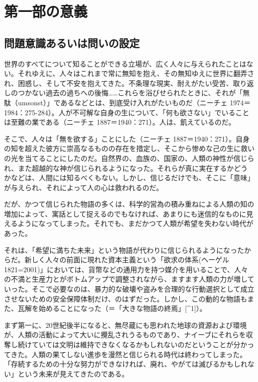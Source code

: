 \section{第一部の意義}\label{ux7b2cux4e00ux90e8ux306eux610fux7fa9}

\subsection{問題意識あるいは問いの設定}\label{ux554fux984cux610fux8b58ux3042ux308bux3044ux306fux554fux3044ux306eux8a2dux5b9a}

世界のすべてについて知ることができる立場が、広く人々に与えられたことはない。それゆえに、人々はこれまで常に無知を抱え、その無知ゆえに世界に翻弄され、困惑し、そして不安を抱えてきた。不条理な現実、耐えがたい受苦、取り返しのつかない過去の過ちへの後悔\ldots\ldots これらを浴びせられたときに、それが「無駄（umsonst）」であるなどとは、到底受け入れがたいものだ（ニーチェ
1974＝1984：275-284）\cite{Nietzsche1}。人が不可解な自身の生について、「何も欲さない」でいることは至難の業である（ニーチェ
1887＝1940：271）\cite{Nietzsche2}。人は、飢えているのだ。

そこで、人々は「無を欲する」ことにした（ニーチェ
1887＝1940：271）\cite{Nietzsche2}。自身の知を超えた彼方に崇高なるものの存在を措定し、そこから惨めな己の生に救いの光を当てることにしたのだ。自然界の、血族の、国家の、人類の神性が信じられ、また超越的な神が信じられるようになった。それらが真に実在するかどうかなどは、人間には知るべくもない。しかし、信じるだけでも、そこに「意味」が与えられ、それによって人の心は救われるのだ。

だが、かつて信じられた物語の多くは、科学的営為の積み重ねによる人類の知の増加によって、寓話として捉えるのでもなければ、あまりにも迷信的なものに見えるようになってしまった。それでも、まだかつて人類が希望を失わない時代があった。

それは、「希望に満ちた未来」という物語が代わりに信じられるようになったからだ。新しく人々の前面に現れた資本主義という「欲求の体系(ヘーゲル　1821=2001)\cite{Hegel}」においては、貨幣などの通用力を持つ媒介を用いることで、人々の不満と生産力とがボトムアップで調整されながら、ますます人類の力が増していった。そこで必要なのは、暴力的な破壊や盗みを合理的な行動選択として成立させないための安全保障体制だけ、のはずだった。しかし、この動的な物語もまた、瓦解を始めることになった（＝「大きな物語の終焉」{[}\^{}1{]}）。

まず第一に、20世紀後半になると、無尽蔵にも思われた地球の資源および環境が、人類の活動によって大いに攪乱されうるものであり、ナイーブにそれらを収奪し続けていては文明は維持できなくなるかもしれないのだということが分かってきた。人類の果てしない進歩を漫然と信じられる時代は終わってしまった。「存続するための十分な努力ができなければ、廃れ、やがては滅びるかもしれない」という未来が見えてきたのである。

